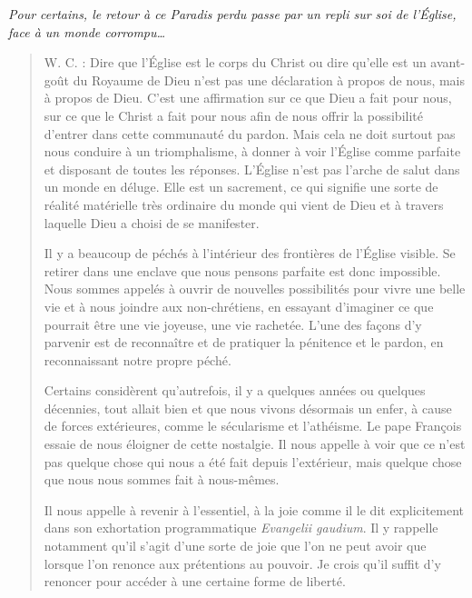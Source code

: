 \textit{Pour certains, le retour à ce Paradis perdu passe par un repli sur soi de l’Église, face à un monde corrompu…
}

\begin{quote}
    

W. C. : Dire que l’Église est le corps du Christ ou dire qu’elle est un avant-goût du Royaume de Dieu n’est pas une déclaration à propos de nous, mais à propos de Dieu. C’est une affirmation sur ce que Dieu a fait pour nous, sur ce que le Christ a fait pour nous afin de nous offrir la possibilité d’entrer dans cette communauté du pardon. Mais cela ne doit surtout pas nous conduire à un triomphalisme, à donner à voir l’Église comme parfaite et disposant de toutes les réponses. L’Église n’est pas l’arche de salut dans un monde en déluge. Elle est un sacrement, ce qui signifie une sorte de réalité matérielle très ordinaire du monde qui vient de Dieu et à travers laquelle Dieu a choisi de se manifester.



Il y a beaucoup de péchés à l’intérieur des frontières de l’Église visible. Se retirer dans une enclave que nous pensons parfaite est donc impossible. Nous sommes appelés à ouvrir de nouvelles possibilités pour vivre une belle vie et à nous joindre aux non-chrétiens, en essayant d’imaginer ce que pourrait être une vie joyeuse, une vie rachetée. L’une des façons d’y parvenir est de reconnaître et de pratiquer la pénitence et le pardon, en reconnaissant notre propre péché.


Certains considèrent qu’autrefois, il y a quelques années ou quelques décennies, tout allait bien et que nous vivons désormais un enfer, à cause de forces extérieures, comme le sécularisme et l’athéisme. Le pape François essaie de nous éloigner de cette nostalgie. Il nous appelle à voir que ce n’est pas quelque chose qui nous a été fait depuis l’extérieur, mais quelque chose que nous nous sommes fait à nous-mêmes.

Il nous appelle à revenir à l’essentiel, à la joie comme il le dit explicitement dans son exhortation programmatique \textit{Evangelii gaudium}. Il y rappelle notamment qu’il s’agit d’une sorte de joie que l’on ne peut avoir que lorsque l’on renonce aux prétentions au pouvoir. Je crois qu’il suffit d’y renoncer pour accéder à une certaine forme de liberté.
\end{quote}

